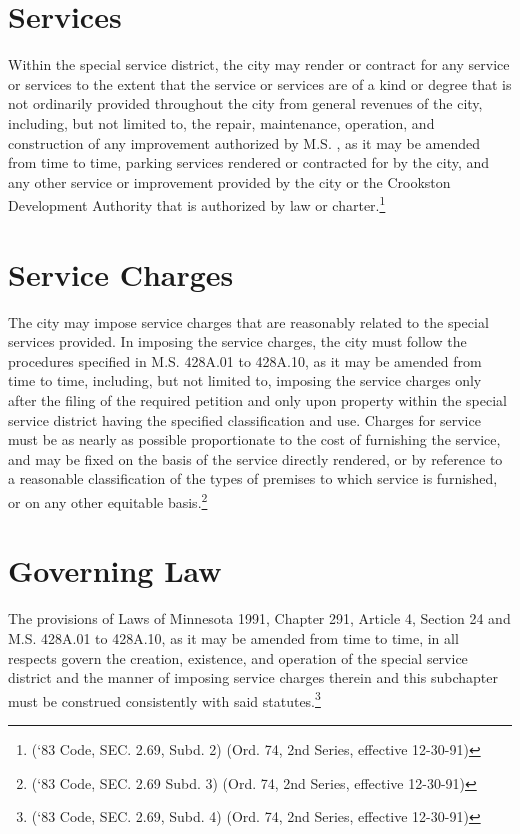 \section{Services}
Within the special service district, the city may render or contract for any service or services to the extent that the service or services are of a kind or degree that is not ordinarily provided throughout the city from general revenues of the city, including, but not limited to, the repair, maintenance, operation, and construction of any improvement authorized by M.S. , as it may be amended from time to time, parking services rendered or contracted for by the city, and any other service or improvement provided by the city or the Crookston Development Authority that is authorized by law or charter.\footnote{(‘83 Code, SEC. 2.69, Subd. 2)  (Ord. 74, 2nd Series, effective 12-30-91)}

\section{Service Charges}
The city may impose service charges that are reasonably related to the special services provided.  In imposing the service charges, the city must follow the procedures specified in M.S. \textsection 428A.01 to \textsection 428A.10, as it may be amended from time to time, including, but not limited to, imposing the service charges only after the filing of the required petition and only upon property within the special service district having the specified classification and use.  Charges for service must be as nearly as possible proportionate to the cost of furnishing the service, and may be fixed on the basis of the service directly rendered, or by reference to a reasonable classification of the types of premises to which service is furnished, or on any other equitable basis.\footnote{(‘83 Code, SEC. 2.69 Subd. 3)  (Ord. 74, 2nd Series, effective 12-30-91)}

\section{Governing Law}
The provisions of Laws of Minnesota 1991, Chapter 291, Article 4, Section 24 and M.S. \textsection 428A.01 to \textsection 428A.10, as it may be amended from time to time, in all respects govern the creation, existence, and operation of the special service district and the manner of imposing service charges therein and this subchapter must be construed consistently with said statutes.\footnote{(‘83 Code, SEC. 2.69, Subd. 4)  (Ord. 74, 2nd Series, effective 12-30-91)}


